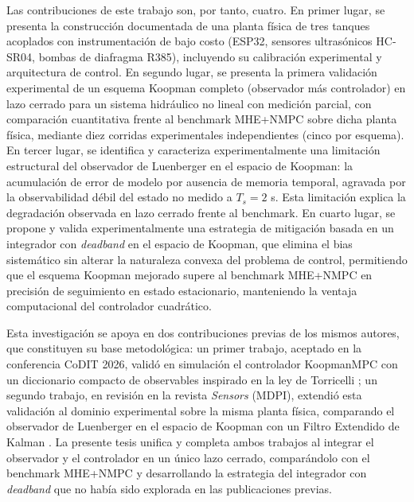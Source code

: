 \documentclass[12pt,letterpaper]{article}
\begin{document}
Las contribuciones de este trabajo son, por tanto, cuatro. En primer lugar, se
presenta la construcción documentada de una planta física de tres tanques acoplados
con instrumentación de bajo costo (ESP32, sensores ultrasónicos HC-SR04, bombas de
diafragma R385), incluyendo su calibración experimental y arquitectura de control.
En segundo lugar, se presenta la primera validación experimental de un esquema
Koopman completo (observador más controlador) en lazo cerrado para un sistema
hidráulico no lineal con medición parcial, con comparación cuantitativa frente al
benchmark MHE+NMPC sobre dicha planta física, mediante diez corridas experimentales
independientes (cinco por esquema). En tercer lugar, se identifica y
caracteriza experimentalmente una limitación estructural del observador de
Luenberger en el espacio de Koopman: la acumulación de error de modelo por ausencia
de memoria temporal, agravada por la observabilidad débil del estado no medido a
$T_s=2$ s. Esta limitación explica la degradación observada en lazo cerrado frente
al benchmark.
En cuarto lugar, se propone y valida experimentalmente una estrategia de mitigación
basada en un integrador con \textit{deadband} en el espacio de Koopman, que elimina
el bias sistemático sin alterar la naturaleza convexa del problema de control,
permitiendo que el esquema Koopman mejorado supere al benchmark MHE+NMPC en
precisión de seguimiento en estado estacionario, manteniendo la ventaja
computacional del controlador cuadrático.

Esta investigación se apoya en dos contribuciones previas de los mismos autores, que
constituyen su base metodológica: un primer trabajo, aceptado en la conferencia
CoDIT 2026, validó en simulación el controlador KoopmanMPC con un diccionario
compacto de observables inspirado en la ley de Torricelli \cite{hernandez2026}; un
segundo trabajo, en revisión en la revista \textit{Sensors} (MDPI), extendió esta
validación al dominio experimental sobre la misma planta física, comparando el
observador de Luenberger en el espacio de Koopman con un Filtro Extendido de Kalman
\cite{hernandez2025sensors}. La presente tesis unifica y completa ambos trabajos al
integrar el observador y el controlador en un único lazo cerrado, comparándolo con
el benchmark MHE+NMPC y desarrollando la estrategia del integrador con
\textit{deadband} que no había sido explorada en las publicaciones previas.
\end{document}
